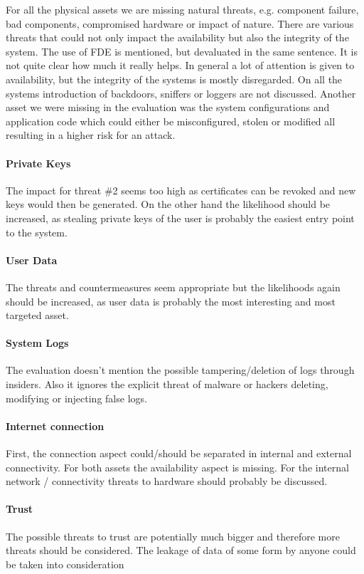 \documentclass[english]{article}
\begin{document}
For all the physical assets we are missing natural threats, e.g. component failure, bad components, compromised hardware or impact of nature. There are various threats that could not only impact the availability but also the integrity of the system. The use of FDE is mentioned, but devaluated in the same sentence. It is not quite clear how much it really helps. In general a lot of attention is given to availability, but the integrity of the systems is mostly disregarded. On all the systems introduction of backdoors, sniffers or loggers are not discussed. Another asset we were missing in the evaluation was the system configurations and application code which could either be misconfigured, stolen or modified all resulting in a higher risk for an attack. 

\paragraph{Private Keys}
The impact for threat \#2 seems too high as certificates can be revoked and new keys would then be generated. On the other hand the likelihood should be increased, as stealing private keys of the user is probably the easiest entry point to the system.  

\paragraph{User Data}
The threats and countermeasures seem appropriate but the likelihoods again should be increased, as user data is probably the most interesting and most targeted asset.

\paragraph{System Logs} 
The evaluation doesn't mention the possible tampering/deletion of logs through insiders. Also it ignores the explicit threat of malware or hackers deleting, modifying or injecting false logs. 

\paragraph{Internet connection} 
First, the connection aspect could/should be separated in internal and external connectivity. For both assets the availability aspect is missing. For the internal network / connectivity threats to hardware should probably be discussed.

\paragraph{Trust} 
The possible threats to trust are potentially much bigger and therefore more threats should be considered. The leakage of data of some form by anyone could be taken into consideration
\end{document}
